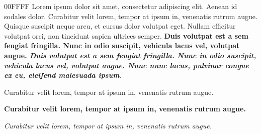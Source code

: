  {00FFFF}
\begindoc
    Lorem ipsum dolor sit amet, consectetur adipiscing elit. Aenean id sodales dolor.
    \linebreak
     {Curabitur velit lorem, tempor at ipsum in, venenatis rutrum augue.}
    \linebreak
    Quisque suscipit neque arcu, et cursus dolor volutpat eget. Nullam efficitur volutpat orci, non tincidunt sapien ultrices semper.
    \bf{Duis volutpat est a sem feugiat fringilla. Nunc in odio suscipit, vehicula lacus vel, volutpat augue.}
    \it{Duis volutpat est a sem feugiat fringilla. Nunc in odio suscipit, vehicula lacus vel, volutpat augue.}
    \linebreak
    \it{Nunc nunc lacus, pulvinar congue ex eu, eleifend malesuada ipsum.}
    \linebreak
    \beginenum
        \item Curabitur velit lorem, tempor at ipsum in, venenatis rutrum augue.
        \item \bf{ {Curabitur velit lorem, tempor at ipsum in, venenatis rutrum augue.}}
        \item \it{Curabitur velit lorem, tempor at ipsum in, venenatis rutrum augue.}
        \item \linebreak
    \endenum
    \linebreak
    \linebreak
\enddoc